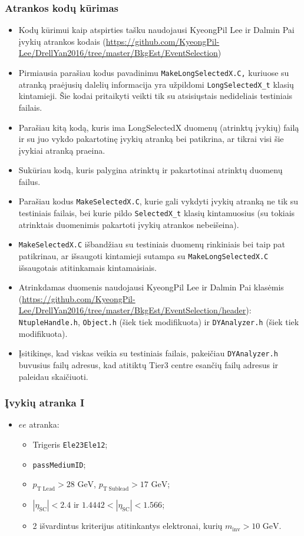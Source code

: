\documentclass{beamer}
\newcommand{\etaSC}{\eta_{\mathrm{SC}}}
\newcommand{\pTl}{\mathit{p}_{\mathrm{T\;Lead}}}
\newcommand{\pTsl}{\mathit{p}_{\mathrm{T\;Sublead}}}
\newcommand{\GeV}{$\mathrm{GeV}$}
\newcommand{\ee}{\mathit{ee}}
\begin{document}
\begin{frame}[allowframebreaks]
\frametitle{Atrankos kodų kūrimas}

\begin{itemize}
	\item Kodų kūrimui kaip atspirties tašku naudojausi KyeongPil Lee ir Dalmin Pai įvykių atrankos kodais (\url{https://github.com/KyeongPil-Lee/DrellYan2016/tree/master/BkgEst/EventSelection})
	\item Pirmiausia parašiau kodus pavadinimu \texttt{MakeLongSelectedX.C,} kuriuose su atranką praėjusių dalelių informacija yra užpildomi \texttt{LongSelectedX\_t} klasių kintamieji. Šie kodai pritaikyti veikti tik su atsisiųstais nedideliais testiniais failais.
	\item Parašiau kitą kodą, kuris ima LongSelectedX duomenų (atrinktų įvykių) failą ir su juo vykdo pakartotinę įvykių atranką bei patikrina, ar tikrai visi šie įvykiai atranką praeina.
	\item Sukūriau kodą, kuris palygina atrinktų ir pakartotinai atrinktų duomenų failus.
	\item Parašiau kodus \texttt{MakeSelectedX.C}, kurie gali vykdyti įvykių atranką ne tik su testiniais failais, bei kurie pildo \texttt{SelectedX\_t} klasių kintamuosius (su tokiais atrinktais duomenimis pakartoti įvykių atrankos nebeišeina).
	\item \texttt{MakeSelectedX.C} išbandžiau su testiniais duomenų rinkiniais bei taip pat patikrinau, ar išsaugoti kintamieji sutampa su \texttt{MakeLongSelectedX.C} išsaugotais atitinkamais kintamaisiais.
	\item Atrinkdamas duomenis naudojausi KyeongPil Lee ir Dalmin Pai klasėmis (\url{https://github.com/KyeongPil-Lee/DrellYan2016/tree/master/BkgEst/EventSelection/header}): \texttt{NtupleHandle.h}, \texttt{Object.h} (šiek tiek modifikuota) ir \texttt{DYAnalyzer.h} (šiek tiek modifikuota).
	\item Įsitikinęs, kad viskas veikia su testiniais failais, pakeičiau \texttt{DYAnalyzer.h} buvusius failų adresus, kad atitiktų Tier3 centre esančių failų adresus ir paleidau skaičiuoti.
\end{itemize}

\end{frame}


\begin{frame}
\frametitle{Įvykių atranka I}

\begin{itemize}
	\item $\ee$ atranka:
	\begin{itemize}
		\item Trigeris \texttt{Ele23Ele12};
		\item \texttt{passMediumID};
		\item $\pTl>28$ \GeV, $\pTsl>17$ \GeV;
		\item $|\etaSC|<2.4$ ir $1.4442<|\etaSC|<1.566$;
		\item 2 išvardintus kriterijus atitinkantys elektronai, kurių $\mathit{m}_{\mathrm{inv}}>10$ \GeV.
	\end{itemize}
\end{itemize}

\end{frame}
\end{document}
